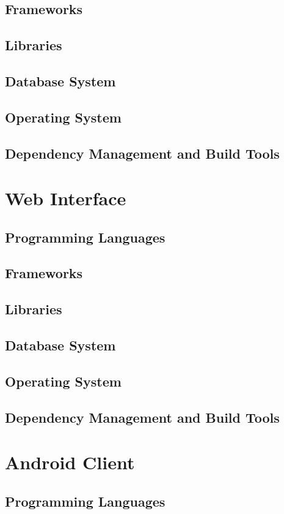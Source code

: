 \documentclass[11pt,fleqn]{book} %
\begin{document}
		\subsection{Frameworks}
		\subsection{Libraries}
		\subsection{Database System}
		\subsection{Operating System}
		\subsection{Dependency Management and Build Tools}
	\section{Web Interface}
		\subsection{Programming Languages}
		\subsection{Frameworks}
		\subsection{Libraries}
		\subsection{Database System}
		\subsection{Operating System}
		\subsection{Dependency Management and Build Tools}
	\section{Android Client}
		\subsection{Programming Languages}
\end{document}
